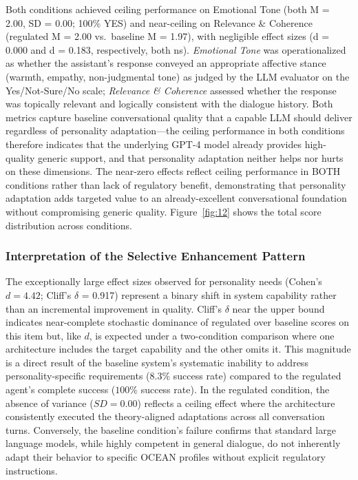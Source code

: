Both conditions achieved ceiling performance on Emotional Tone (both M = 2.00, SD = 0.00; 100\% YES) and near-ceiling on Relevance \& Coherence (regulated M = 2.00 vs.~baseline M = 1.97), with negligible effect sizes (d = 0.000 and d = 0.183, respectively, both ns). \emph{Emotional Tone} was operationalized as whether the assistant's response conveyed an appropriate affective stance (warmth, empathy, non-judgmental tone) as judged by the LLM evaluator on the Yes/Not-Sure/No scale; \emph{Relevance \& Coherence} assessed whether the response was topically relevant and logically consistent with the dialogue history. Both metrics capture baseline conversational quality that a capable LLM should deliver regardless of personality adaptation---the ceiling performance in both conditions therefore indicates that the underlying GPT-4 model already provides high-quality generic support, and that personality adaptation neither helps nor hurts on these dimensions. The near-zero effects reflect ceiling performance in BOTH conditions rather than lack of regulatory benefit, demonstrating that personality adaptation adds targeted value to an already-excellent conversational foundation without compromising generic quality. Figure~\ref{fig:12} shows the total score distribution across conditions.



\subsubsection{Interpretation of the Selective Enhancement Pattern}\label{interpretation-of-the-selective-enhancement-pattern}

The exceptionally large effect sizes observed for personality needs (Cohen's \(d = 4.42\); Cliff's \(\delta\) = 0.917) represent a binary shift in system capability rather than an incremental improvement in quality. Cliff's \(\delta\) near the upper bound indicates near-complete stochastic dominance of regulated over baseline scores on this item but, like \(d\), is expected under a two-condition comparison where one architecture includes the target capability and the other omits it. This magnitude is a direct result of the baseline system's systematic inability to address personality-specific requirements (\(8.3\%\) success rate) compared to the regulated agent's complete success (\(100\%\) success rate). In the regulated condition, the absence of variance (\(SD = 0.00\)) reflects a ceiling effect where the architecture consistently executed the theory-aligned adaptations across all conversation turns. Conversely, the baseline condition's failure confirms that standard large language models, while highly competent in general dialogue, do not inherently adapt their behavior to specific OCEAN profiles without explicit regulatory instructions.

